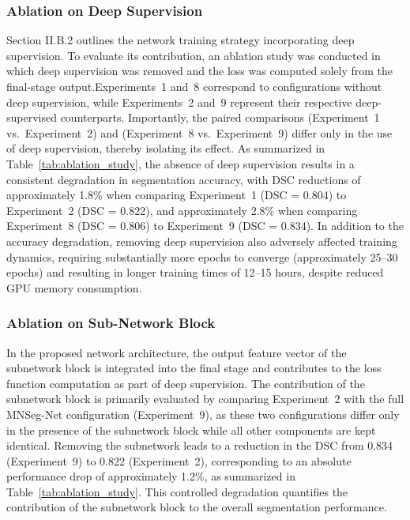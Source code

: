 \subsubsection{Ablation on Deep Supervision}
Section II.B.2 outlines the network training strategy incorporating deep supervision. To evaluate its contribution, an ablation study was conducted in which deep supervision was removed and the loss was computed solely from the final-stage output.Experiments~1 and~8 correspond to configurations without deep supervision, while Experiments~2 and~9 represent their respective deep-supervised counterparts. Importantly, the paired comparisons (Experiment~1 vs.~Experiment~2) and (Experiment~8 vs.~Experiment~9) differ only in the use of deep supervision, thereby isolating its effect. As summarized in Table~\ref{tab:ablation_study}, the absence of deep supervision results in a consistent degradation in segmentation accuracy, with DSC reductions of approximately 1.8\% when comparing Experiment~1 (DSC = 0.804) to Experiment~2 (DSC = 0.822), and approximately 2.8\% when comparing Experiment~8 (DSC = 0.806) to Experiment~9 (DSC = 0.834). In addition to the accuracy degradation, removing deep supervision also adversely affected training dynamics, requiring substantially more epochs to converge (approximately 25--30 epochs) and resulting in longer training times of 12--15 hours, despite reduced GPU memory consumption.



 

\subsubsection{Ablation on Sub-Network Block}
In the proposed network architecture, the output feature vector of the subnetwork block is integrated into the final stage and contributes to the loss function computation as part of deep supervision. The contribution of the subnetwork block is primarily evaluated by comparing Experiment~2 with the full MNSeg-Net configuration (Experiment~9), as these two configurations differ only in the presence of the subnetwork block while all other components are kept identical. Removing the subnetwork leads to a reduction in the DSC from 0.834 (Experiment~9) to 0.822 (Experiment~2), corresponding to an absolute performance drop of approximately 1.2\%, as summarized in Table~\ref{tab:ablation_study}. This controlled degradation quantifies the contribution of the subnetwork block to the overall segmentation performance.


